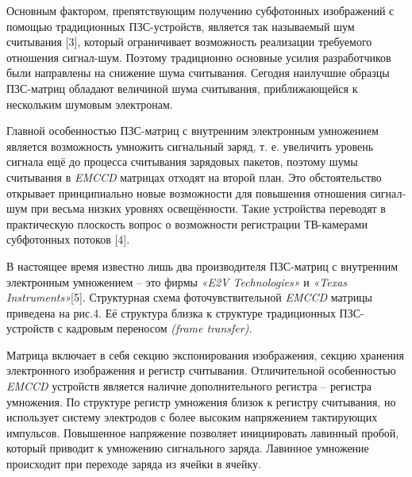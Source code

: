 \documentclass[11pt]{article}
\begin{document}
Основным фактором, препятствующим получению субфотонных изображений с помощью традиционных ПЗС-устройств, является так называемый шум считывания
[3], который ограничивает возможность реализации требуемого отношения сигнал-шум. Поэтому традиционно основные усилия разработчиков были направлены
на снижение шума считывания. Сегодня наилучшие образцы ПЗС-матриц обладают величиной шума считывания, приближающейся к нескольким шумовым электронам.

Главной особенностью ПЗС-матриц с внутренним электронным умножением
является возможность умножить сигнальный заряд, т. е. увеличить уровень
сигнала ещё до процесса считывания зарядовых пакетов, поэтому шумы считывания в \textit{EMCCD} матрицах отходят на второй план. Это обстоятельство открывает
принципиально новые возможности для повышения отношения сигнал-шум при
весьма низких уровнях освещённости. Такие устройства переводят в практическую плоскость вопрос о возможности регистрации ТВ-камерами субфотонных потоков [4].

В настоящее время известно лишь два производителя ПЗС-матриц с внутренним
электронным умножением – это фирмы \textit{«E2V Technologies»} и \textit{«Texas Instruments»}[5]. Структурная схема фоточувствительной \textit{EMCCD} матрицы приведена на рис.4. Её структура близка к структуре традиционных ПЗС-устройств с кадровым переносом \textit{(frame transfer)}.

Матрица включает в себя секцию экспонирования изображения, секцию хранения электронного изображения и регистр считывания. Отличительной особенностью \textit {EMCCD} устройств является наличие дополнительного регистра – регистра умножения. По структуре регистр умножения близок к регистру считывания, но использует систему электродов с более высоким напряжением тактирующих импульсов. Повышенное напряжение позволяет инициировать лавинный пробой, который приводит к умножению
сигнального заряда. Лавинное умножение происходит при переходе заряда из ячейки в ячейку.
\end{document}
